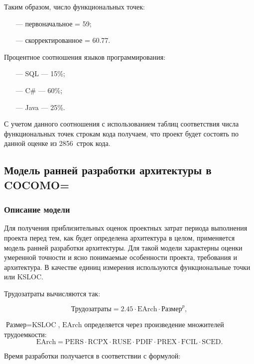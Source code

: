 Таким образом, число функциональных точек:

\begin{itemize}
    \item[---] первоначальное = 59;
    \item[---] скорректированное = 60.77.
\end{itemize}

Процентное соотношения языков программирования:

\begin{itemize}
    \item[---] SQL --- 15\%;
    \item[---] C\# --- 60\%;
    \item[---] Java --- 25\%.
\end{itemize}

С учетом данного соотношения с использованием таблиц соответствия числа функциональных точек строкам кода получаем, что проект будет состоять по данной оценке из 2856~строк кода.


\subsection*{Модель ранней разработки архитектуры в COCOMO=}

\subsubsection*{Описание модели}

Для получения приблизительных оценок проектных затрат периода выполнения проекта перед тем, как будет определена архитектура в целом, применяется модель ранней разработки архитектуры. Для такой модели характерны  оценки умеренной точности и ясно понимаемые особенности проекта, требования и архитектура. В качестве единиц измерения используются функциональные точки или KSLOC. 

Трудозатраты вычисляются так:

$$\text{Трудозатраты} = 2.45 \cdot \text{EArch} \cdot \text{Размер}^p,$$

 $\text{Размер} = \text{KSLOC}$, $\text{EArch}$ определяется через произведение множителей трудоемкости:
$$\text{EArch} = \text{PERS} \cdot \text{RCPX} \cdot \text{RUSE} \cdot \text{PDIF} \cdot \text{PREX} \cdot \text{FCIL} \cdot \text{SCED}.$$

Время разработки получается в соответствии с формулой:

